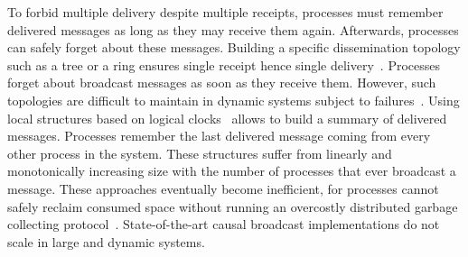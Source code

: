 To forbid multiple delivery despite multiple receipts, processes must remember
delivered messages as long as they may receive them again. Afterwards, processes
can safely forget about these messages.
Building a specific dissemination topology such as a tree or a ring ensures
single receipt hence single
delivery~\cite{bravo2017saturn,raynal2013distributed}. Processes forget about
broadcast messages as soon as they receive them. However, such topologies are
difficult to maintain in dynamic systems subject to
failures~\cite{krasikova2016hashtable}.  Using local structures based on logical
clocks~\cite{malkhi2007concise,mukund2014optimized} allows to build a summary of
delivered messages. Processes remember the last delivered message coming from
every other process in the system.  These structures suffer from linearly and
monotonically increasing size with the number of processes that ever broadcast a
message.  These approaches eventually become inefficient, for processes cannot
safely reclaim consumed space without running an overcostly distributed garbage
collecting protocol~\cite{abdullahi1998garbage}. State-of-the-art causal
broadcast implementations do not scale in large and dynamic systems.



